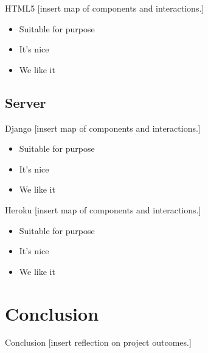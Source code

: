 \documentclass{beamer}
\begin{document}
\begin{frame}{HTML5}
  [insert map of components and interactions.]
  \begin{itemize}
    \item Suitable for purpose
    \item It's nice
    \item We like it
  \end{itemize}
\end{frame}

\subsection{Server}

\begin{frame}{Django}
  [insert map of components and interactions.]
  \begin{itemize}
    \item Suitable for purpose
    \item It's nice
    \item We like it
  \end{itemize}
\end{frame}

\begin{frame}{Heroku}
  [insert map of components and interactions.]
  \begin{itemize}
    \item Suitable for purpose
    \item It's nice
    \item We like it
  \end{itemize}
\end{frame}


\section{Conclusion}

\begin{frame}{Conclusion}
  [insert reflection on project outcomes.]
\end{frame}
\end{document}
